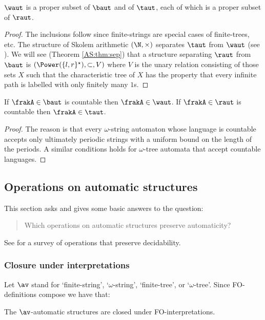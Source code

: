 \begin{proposition} \label{AS:prop:relations}
$\waut$ is a proper subset of $\baut$ and of $\taut$, each of which is a proper subset of $\raut$.
\end{proposition} 

\begin{proof} The inclusions follow since finite-strings are special cases of finite-trees, etc.
The structure of Skolem arithmetic $(\N,\times)$ separates $\taut$ from $\waut$ (see \cite{Blum99}).
We will see (Theorem \ref{AS:thm:sep}) that a structure separating $\raut$ from $\baut$ is $(\Power(\{l,r\}^\star),\subset,V)$ where $V$ is the unary relation consisting of those sets $X$ such that the characteristic tree of $X$ has the property that every infinite path is labelled with only finitely many $1$s.
\end{proof}

\begin{proposition}
If $\frakA \in \baut$ is countable then $\frakA \in \waut$.
If $\frakA \in \raut$ is countable then $\frakA \in \taut$.
\end{proposition}

\begin{proof}
The reason is that every $\omega$-string automaton whose language is countable accepts only ultimately periodic strings with a uniform bound on the length of the periods. A similar conditions holds for $\omega$-tree automata that accept countable languages.
\end{proof}
%
\subsection{Operations on automatic structures}

This section asks and gives some basic answers to the question:
\begin{quote}
Which operations on automatic structures preserve automaticity?
\end{quote}
 See \cite{BCL07} for a survey of operations that preserve decidability.
 
\subsubsection*{Closure under interpretations}
Let $\av$ stand for `finite-string', `$\omega$-string', `finite-tree', or `$\omega$-tree'.
Since FO-definitions compose we have that:
\begin{proposition} \cite{Blum99}
The $\av$-automatic structures are closed under FO-interpretations.
\end{proposition}

